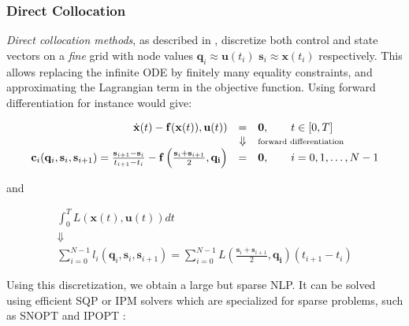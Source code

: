 \subsubsection{Direct Collocation}

\emph{Direct collocation methods}, as described in
\cite{tsang1975optimal}, discretize both control and state vectors on
a \emph{fine} grid with node values
$\mathbf{q}_i\approx\mathbf{u}(t_i)$
$\mathbf{s}_i\approx\mathbf{x}(t_i)$ respectively. This allows
replacing the infinite ODE by finitely many equality constraints, and
approximating the Lagrangian term in the objective function. Using
forward differentiation for instance would give:

\begin{equation}
  \begin{array}{rcl}
    \dot{\mathbf{x}}(t) -
    \mathbf{f}(\mathbf{x}(t)),\mathbf{u}(t)) & = & \mathbf{0}, \qquad t\in[0,T] \\
    & \Downarrow  & \text{\scriptsize forward differentiation}\\
    \mathbf{c}_i(\mathbf{q}_i,\mathbf{s}_i,\mathbf{s}_{i+1}) =
    \frac{\mathbf{s}_{i+1}-\mathbf{s}_i}{t_{i+1}-t_i} -
    \mathbf{f}\left(\frac{\mathbf{s}_{i}+\mathbf{s}_{i+1}}{2},
    \mathbf{q_i}\right) & = & \mathbf{0}, \qquad i=0,1,\ldots,N-1
  \end{array}
\end{equation}

\noindent and

\begin{equation}
  \begin{array}{c}
    \int_{0}^{T}L (\mathbf{x}(t), \mathbf{u}(t))dt \\ 
    \Downarrow \\
    \sum_{i=0}^{N-1}l_i(\mathbf{q}_i,\mathbf{s}_i,\mathbf{s}_{i+1})=\sum_{i=0}^{N-1}L\left(\frac{\mathbf{s}_{i}+\mathbf{s}_{i+1}}{2},
    \mathbf{q_i}\right)(t_{i+1}-t_i)
  \end{array}
\end{equation}

Using this discretization, we obtain a large but sparse NLP. It can be
solved using efficient SQP or IPM solvers which are specialized for
sparse problems, such as \textsc{SNOPT} \cite{gill2002snopt} and \textsc{IPOPT}
\cite{Biegler2009}:

